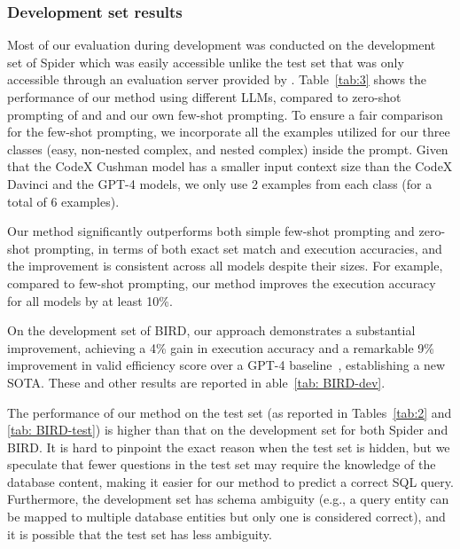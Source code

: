 \subsubsection{Development set results}
 Most of our evaluation during development was conducted on the development set of Spider which was easily accessible unlike the test set that was only accessible through an evaluation server provided by \citet{yu2018spider}. %
 Table~\ref{tab:3} shows the performance of our method using different LLMs, compared to zero-shot prompting of \citet{rajkumar2022evaluating} and \citet{liu2023comprehensive} and our own few-shot prompting. To ensure a fair comparison for the few-shot prompting, we incorporate all the examples utilized for our three classes (easy, non-nested complex, and nested complex) inside the prompt. Given that the CodeX Cushman model has a smaller input context size than the CodeX Davinci and the GPT-4 models, we only use 2 examples from each class (for a total of 6 examples). 

Our method significantly outperforms both simple few-shot prompting and zero-shot prompting, in terms of both exact set match and execution accuracies, and the improvement is consistent across all models despite their sizes. For example, compared to few-shot prompting, our method improves the execution accuracy for all models by at least 10\%.

On the development set of BIRD, our approach demonstrates a substantial improvement, achieving a 4\% gain in execution accuracy and a remarkable 9\% improvement in valid efficiency score over a GPT-4 baseline~\cite{li2023llm}, establishing a new SOTA. These and other results are reported in able~\ref{tab: BIRD-dev}.

The performance of our method on the test set (as reported in Tables~\ref{tab:2} and \ref{tab: BIRD-test}) is higher than that on the development set for both Spider and BIRD. It is hard to pinpoint the exact reason when the test set is hidden, but we speculate that fewer questions in the test set may require the knowledge of the database content, making it easier for our method to predict a correct SQL query. Furthermore, the development set has schema ambiguity (e.g., a query entity can be mapped to multiple database entities but only one is considered correct), and it is possible that the test set has less ambiguity.

